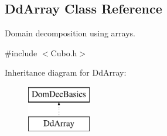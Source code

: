 \hypertarget{classDdArray}{}\subsection{Dd\+Array Class Reference}
\label{classDdArray}


Domain decomposition using arrays.  




{\ttfamily \#include $<$Cubo.\+h$>$}

Inheritance diagram for Dd\+Array\+:\begin{figure}[H]
\begin{center}
\leavevmode
\includegraphics[height=2.000000cm]{classDdArray}
\end{center}
\end{figure}
